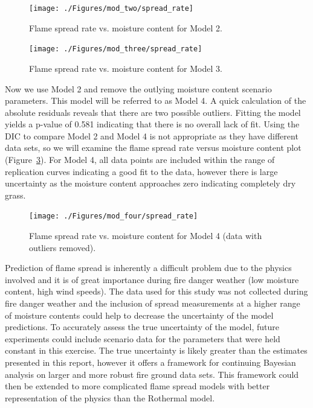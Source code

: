 \documentclass[11pt]{article}
\begin{document}
\begin{figure}[h]
\begin{center}
\texttt{[image: ./Figures/mod\_two/spread\_rate]}
\end{center}
\caption{Flame spread rate vs. moisture content for Model 2.}
\label{fig:m2_rate} 
\end{figure}

\begin{figure}[h]
\begin{center}
\texttt{[image: ./Figures/mod\_three/spread\_rate]}
\end{center}
\caption{Flame spread rate vs. moisture content for Model 3.}
\label{fig:m3_rate} 
\end{figure}

Now we use Model 2 and remove the outlying moisture content scenario parameters. This model will be referred to as Model 4. A quick calculation of the absolute residuals reveals that there are two possible outliers. Fitting the model yields a p-value of 0.581 indicating that there is no overall lack of fit. Using the DIC to compare Model 2 and Model 4 is not appropriate as they have different data sets, so we will examine the flame spread rate versus moisture content plot (Figure~\ref{fig:m4_rate}). For Model 4, all data points are included within the range of replication curves indicating a good fit to the data, however there is large uncertainty as the moisture content approaches zero indicating completely dry grass. 

\begin{figure}[h]
\begin{center}
\texttt{[image: ./Figures/mod\_four/spread\_rate]}
\end{center}
\caption{Flame spread rate vs. moisture content for Model 4 (data with outliers removed).}
\label{fig:m4_rate} 
\end{figure}



Prediction of flame spread is inherently a difficult problem due to the physics involved and it is of great importance during fire danger weather (low moisture content, high wind speeds). The data used for this study was not collected during fire danger weather and the inclusion of spread measurements at a higher range of moisture contents could help to decrease the uncertainty of the model predictions. To accurately assess the true uncertainty of the model, future experiments could include scenario data for the parameters that were held constant in this exercise. The true uncertainty is likely greater than the estimates presented in this report, however it offers a framework for continuing Bayesian analysis on larger and more robust fire ground data sets. This framework could then be extended to more complicated flame spread models with better representation of the physics than the Rothermal model.
\end{document}
